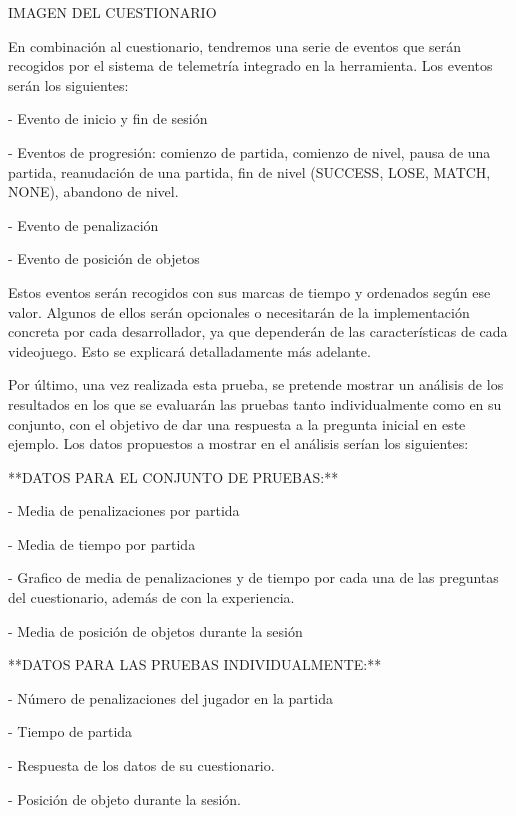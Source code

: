 IMAGEN DEL CUESTIONARIO


En combinación al cuestionario, tendremos una serie de eventos que serán recogidos por el sistema de telemetría integrado en la herramienta. Los eventos serán los siguientes:

- Evento de inicio y fin de sesión

- Eventos de progresión: comienzo de partida, comienzo de nivel, pausa de una partida, reanudación de una partida, fin de nivel (SUCCESS, LOSE, MATCH, NONE), abandono de nivel.

- Evento de penalización

- Evento de posición de objetos


Estos eventos serán recogidos con sus marcas de tiempo y ordenados según ese valor. Algunos de ellos serán opcionales o necesitarán de la implementación concreta por cada desarrollador, ya que dependerán de las características de cada videojuego. Esto se explicará detalladamente más adelante.


Por último, una vez realizada esta prueba, se pretende mostrar un análisis de los resultados en los que se evaluarán las pruebas tanto individualmente como en su conjunto, con el objetivo de dar una respuesta a la pregunta inicial en este ejemplo. Los datos propuestos a mostrar en el análisis serían los siguientes:


**DATOS PARA EL CONJUNTO DE PRUEBAS:**

- Media de penalizaciones por partida

- Media de tiempo por partida

- Grafico de media de penalizaciones y de tiempo por cada una de las preguntas del cuestionario, además de con la experiencia.

- Media de posición de objetos durante la sesión


**DATOS PARA LAS PRUEBAS INDIVIDUALMENTE:**

- Número de penalizaciones del jugador en la partida

- Tiempo de partida

- Respuesta de los datos de su cuestionario.

- Posición de objeto durante la sesión.


